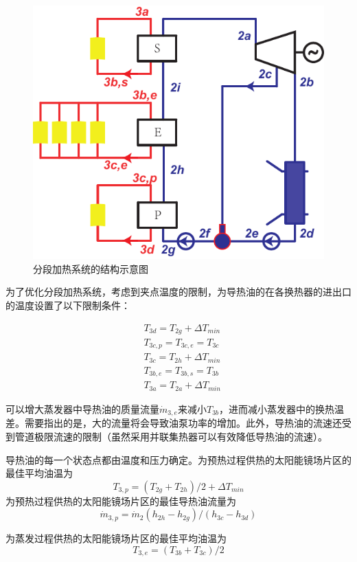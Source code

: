 \noindent \begin{figure}[htbp]
\begin{center}
	\includegraphics[width = 0.5\columnwidth]{fig/SEP}
	\caption{分段加热系统的结构示意图}
	\label{fig:SEP}
\end{center}
\end{figure}

为了优化分段加热系统，考虑到夹点温度的限制，为导热油的在各换热器的进出口的温度设置了以下限制条件：

\begin{eqnarray*}
	&T_{3d} = T_{2g} + \Delta T_{min}\\
   &T_{3c,p} = T_{3c,e} = T_{3c}\\
   &T_{3c} = T_{2h} + \Delta T_{min}\\
	&T_{3b,e} = T_{3b,s} = T_{3b}\\
	&T_{3a} = T_{2a} + \Delta T_{min}
\end{eqnarray*}

可以增大蒸发器中导热油的质量流量$\dot{m}_{3,e}$来减小$T_{3b}$，进而减小蒸发器中的换热温差。需要指出的是，大的流量将会导致油泵功率的增加。此外，导热油的流速还受到管道极限流速的限制（虽然采用并联集热器可以有效降低导热油的流速）。

导热油的每一个状态点都由温度和压力确定。为预热过程供热的太阳能镜场片区的最佳平均油温为
\begin{equation}
  T_{3,p} = (T_{2g} + T_{2h})/2 + \Delta T_{min}
\end{equation}
为预热过程供热的太阳能镜场片区的最佳导热油流量为
\begin{equation}
  \dot{m}_{3,p} = \dot{m}_{2}(h_{2h} - h_{2g})/(h_{3c} - h_{3d})
\end{equation}

为蒸发过程供热的太阳能镜场片区的最佳平均油温为
\begin{equation}
  T_{3,e} = (T_{3b} + T_{3c})/2
\end{equation}

